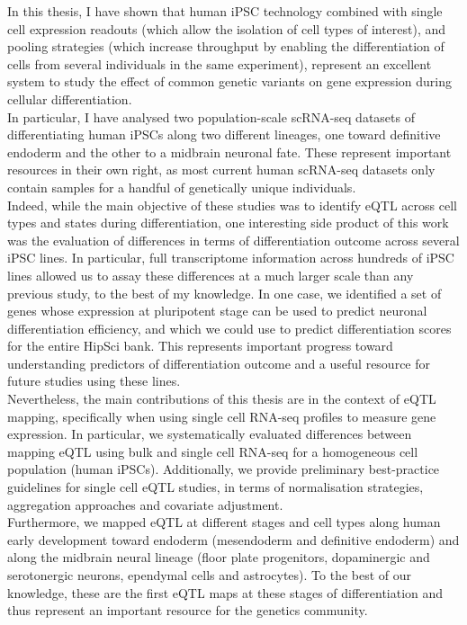 In this thesis, I have shown that human iPSC technology combined with single cell expression readouts (which allow the isolation of cell types of interest), and pooling strategies (which increase throughput by enabling the differentiation of cells from several individuals in the same experiment), represent an excellent system to study the effect of common genetic variants on gene expression during cellular differentiation. \\

In particular, I have analysed two population-scale scRNA-seq datasets of differentiating human iPSCs along two different lineages, one toward definitive endoderm and the other to a midbrain neuronal fate. 
These represent important resources in their own right, as most current human scRNA-seq datasets only contain samples for a handful of genetically unique individuals. \\

Indeed, while the main objective of these studies was to identify eQTL across cell types and states during differentiation, one interesting side product of this work was the evaluation of differences in terms of differentiation outcome across several iPSC lines.
In particular, full transcriptome information across hundreds of iPSC lines allowed us to assay these differences at a much larger scale than any previous study, to the best of my knowledge.
In one case, we identified a set of genes whose expression at pluripotent stage can be used to predict neuronal differentiation efficiency, and which we could use to predict differentiation scores for the entire HipSci bank.
This represents important progress toward understanding predictors of differentiation outcome and a useful resource for future studies using these lines. \\

Nevertheless, the main contributions of this thesis are in the context of eQTL mapping, specifically when using single cell RNA-seq profiles to measure gene expression.
In particular, we systematically evaluated differences between mapping eQTL using bulk and single cell RNA-seq for a homogeneous cell population (human iPSCs).
Additionally, we provide preliminary best-practice guidelines for single cell eQTL studies, in terms of normalisation strategies, aggregation approaches and covariate adjustment.\\

Furthermore, we mapped eQTL at different stages and cell types along human early development toward endoderm (mesendoderm and definitive endoderm) and along the midbrain neural lineage (floor plate progenitors, dopaminergic and serotonergic neurons, ependymal cells and astrocytes). 
To the best of our knowledge, these are the first eQTL maps at these stages of differentiation and thus represent an important resource for the genetics community. \\

